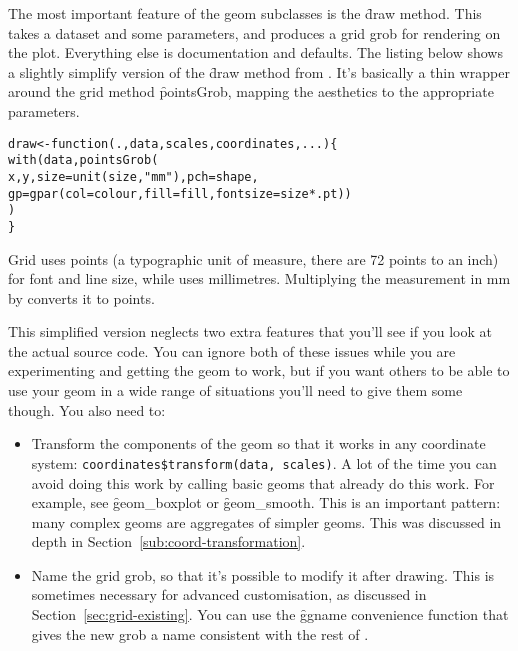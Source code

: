 The most important feature of the geom subclasses is the \f{draw} method.  This takes a dataset and some parameters, and produces a grid grob for rendering on the plot.  Everything else is documentation and defaults.  The listing below shows a slightly simplify version of the \f{draw} method from .  It's basically a thin wrapper around the grid method \f{pointsGrob}, mapping the aesthetics to the appropriate parameters.

% 
\begin{alltt}
draw <- function(., data, scales, coordinates, ...) \verb|{|    
  with(data, pointsGrob(
      x, y, size = unit(size, "mm"), pch = shape, 
      gp = gpar(col = colour, fill = fill, fontsize = size * .pt))
  )
\verb|}|\end{alltt}


Grid uses points (a typographic unit of measure, there are 72 points to an inch) for font and line size, while \ggplot uses millimetres.  Multiplying the   measurement in mm by  converts it to points.  

This simplified version neglects two extra features that you'll see if you look at the actual source code.  You can ignore both of these issues while you are experimenting and getting the geom to work, but if you want others to be able to use your geom in a wide range of situations you'll need to give them some though.  You also need to:

\begin{itemize}
  \item Transform the components of the geom so that it works in any coordinate system: \verb|coordinates$transform(data, scales)|.  A lot of the time you can avoid doing this work by calling basic geoms that already do this work.  For example, see \f{geom_boxplot} or \f{geom_smooth}.  This is an important pattern: many complex geoms are aggregates of simpler geoms.  This was discussed in depth in Section~\ref{sub:coord-transformation}.

  \item Name the grid grob, so that it's possible to modify it after drawing.  This is sometimes necessary for advanced customisation, as discussed in Section~\ref{sec:grid-existing}.  You can use the \f{ggname} convenience function that gives the new grob a name consistent with the rest of \ggplot.
\end{itemize}

